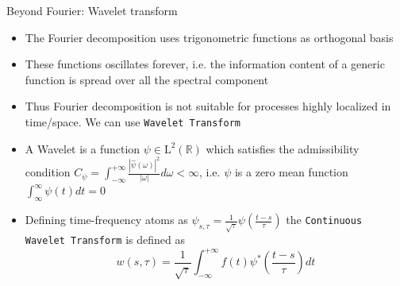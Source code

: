 \documentclass[t,10pt]{beamer}
\begin{document}
\begin{frame}{Beyond Fourier: Wavelet transform}
\begin{itemize}[<+->]
\item The Fourier decomposition uses trigonometric functions as
  orthogonal basis
\item These functions oscillates forever,
  i.e. the information content of a generic function is spread over
  all the spectral component
\item Thus Fourier decomposition is not suitable for processes highly
  localized in time/space. We can use
  \textcolor{tachameleon}{\texttt{Wavelet Transform}}{\footnotesize \parencite{Farge:1992un}}
\item A Wavelet is a function $\psi\in \mathrm{L}^2(\mathbb{R})$ which
  satisfies the admissibility condition
  $C_{\psi}=\int_{-\infty}^{+\infty}\frac{|\hat{\psi}(\omega)|^2}{|\omega|}d\omega
  < \infty$, i.e. $\psi$ is a zero mean function
  $\int_{\infty}^{\infty}\psi(t)dt =0$
\item Defining time-frequency atoms as
  $\psi_{s,\tau}=\frac{1}{\sqrt{\tau}}\psi\left(\frac{t-s}{\tau}\right)$ the
  \textcolor{tachameleon}{\texttt{Continuous Wavelet Transform}} is
  defined as 
\begin{equation*}
w(s,\tau)=\frac{1}{\sqrt{\tau}}\int_{-\infty}^{+\infty}f(t)\psi^{*}\left(\frac{t-s}{\tau}\right)dt
\end{equation*}
\end{itemize}
\end{frame}
\end{document}
